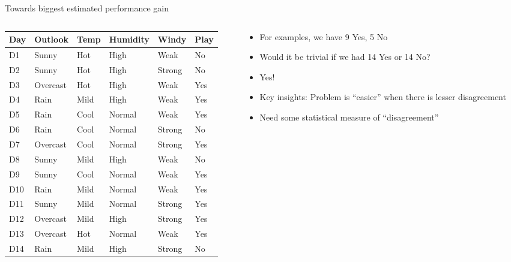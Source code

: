 \documentclass[usenames,dvipsnames]{beamer}
\begin{document}
\begin{frame}{Towards biggest estimated performance gain}
\begin{columns}
\begin{column}{.7\textwidth}


\begin{scriptsize}


	\begin{tabular}{lllll||l} \toprule
	\textbf{Day} & \textbf{Outlook}  & \textbf{Temp} & \textbf{Humidity} & \textbf{Windy}  & \textbf{Play} \\ \midrule
	D1  & Sunny    & Hot  & High     & Weak   & No   \\
	D2  & Sunny    & Hot  & High     & Strong & No   \\
	D3  & Overcast & Hot  & High     & Weak   & Yes  \\
	D4  & Rain     & Mild & High     & Weak   & Yes  \\
	D5  & Rain     & Cool & Normal   & Weak   & Yes  \\
	D6  & Rain     & Cool & Normal   & Strong & No   \\
	D7  & Overcast & Cool & Normal   & Strong & Yes  \\
	D8  & Sunny    & Mild & High     & Weak   & No   \\
	D9  & Sunny    & Cool & Normal   & Weak   & Yes  \\
	D10 & Rain     & Mild & Normal   & Weak   & Yes  \\
	D11 & Sunny    & Mild & Normal   & Strong & Yes  \\
	D12 & Overcast & Mild & High     & Strong & Yes  \\
	D13 & Overcast & Hot  & Normal   & Weak   & Yes  \\
	D14 & Rain     & Mild & High     & Strong & No  \\ \bottomrule
\end{tabular}
\end{scriptsize}
\end{column}
\begin{column}{0.4\textwidth}
	\begin{scriptsize}
\begin{itemize}
	\pause \item For examples, we have 9 Yes, 5 No
	\pause \item Would it be trivial if we had 14 Yes or 14 No?
	\pause \item Yes!
	\pause \item Key insights:  Problem is ``easier'' when there is lesser disagreement
	\pause 	\item Need some statistical measure of ``disagreement'' 
	\end{itemize}

\end{scriptsize}
\end{column}

\end{columns}

\end{frame}
\end{document}
